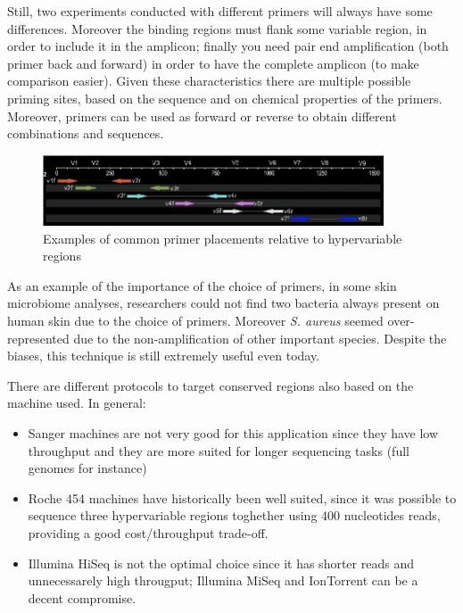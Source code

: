     Still, two experiments conducted with different primers will always have some differences.
    Moreover the binding regions must flank some variable region, in order to include it in the amplicon; finally you need pair end amplification (both primer back and forward) in order to have the complete amplicon (to make comparison easier). Given these characteristics there are multiple possible priming sites, based on the sequence and on chemical properties of the primers. Moreover, primers can be used as forward or reverse to obtain different combinations and sequences.

    \begin{figure}[!h]
      \centering
      \includegraphics[width=0.9\textwidth]{primer_placement.png}
      \caption{\label{fig:primer_placement}Examples of common primer placements relative to hypervariable regions}
    \end{figure}

    As an example of the importance of the choice of primers, in some skin microbiome analyses, researchers could not find two bacteria always present on human skin due to the choice of primers. Moreover \textit{S. aureus} seemed over-represented due to the non-amplification of other important species. Despite the biases, this technique is still extremely useful even today.

    There are different protocols to target conserved regions also based on the machine used. In general:
    \begin{itemize}
      \item Sanger machines are not very good for this application since they have low throughput and they are more suited for longer sequencing tasks (full genomes for instance)
      \item Roche 454 machines have historically been well suited, since it was possible to sequence three hypervariable regions toghether using 400 nucleotides reads, providing a good cost/throughput trade-off.
      \item Illumina HiSeq is not the optimal choice since it has shorter reads and unnecessarely high througput; Illumina MiSeq and IonTorrent can be a decent compromise.
    \end{itemize}

